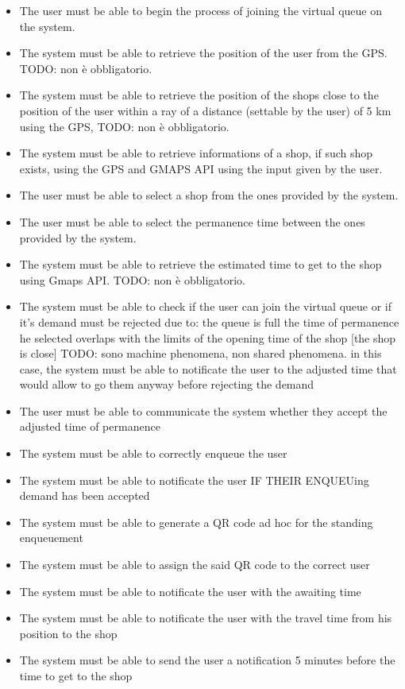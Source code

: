 \begin{itemize}[topsep=0pt]
    \item The user must be able to begin the process of joining the virtual queue on the system.
    \item The system must be able to retrieve the position of the user from the GPS. TODO: non è obbligatorio.
    \item The system must be able to retrieve the position of the shops close to the position of the user within a ray of a distance (settable by the user) of 5 km using the GPS, TODO: non è obbligatorio.
    \item The system must be able to retrieve informations of a shop, if such shop exists, using the GPS and GMAPS API using the input given by the user.
    \item The user must be able to select a shop from the ones provided by the system.
    \item The user must be able to select the permanence time between the ones provided by the system.
    \item The system must be able to retrieve the estimated time to get to the shop using Gmaps API. TODO: non è obbligatorio.
    \item The system must be able to check if the user can join the virtual queue or if it’s demand must be rejected due to:
                       the queue is full
                       the time of permanence he selected overlaps with the limits of the opening time of the shop [the shop is close]
                       TODO: sono machine phenomena, non shared phenomena.
    in this case, the system must be able to notificate the user to the adjusted time that would allow to go them anyway before rejecting the demand
    \item The user must be able to communicate the system whether they accept the adjusted time of permanence
    \item The system must be able to correctly enqueue the user
    \item The system must be able to notificate the user IF THEIR ENQUEUing demand has been accepted
    \item The system must be able to generate a QR code ad hoc for the standing enqueuement
    \item The system must be able to assign the said QR code to the correct user
    \item The system must be able to notificate the user with the awaiting time 
    \item The system must be able to notificate the user with the travel time from his position to the shop 
    \item The system must be able to send the user a notification 5 minutes before the time to get to the shop 
\end{itemize}

